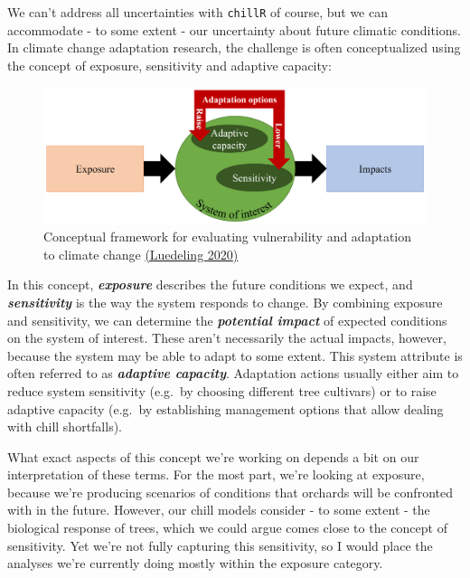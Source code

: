 \documentclass[
]{book}
\begin{document}
We can't address all uncertainties with \texttt{chillR} of course, but we can accommodate - to some extent - our uncertainty about future climatic conditions. In climate change adaptation research, the challenge is often conceptualized using the concept of exposure, sensitivity and adaptive capacity:

\begin{figure}
\centering
\includegraphics{pictures/adaptation_challenge.png}
\caption{Conceptual framework for evaluating vulnerability and adaptation to climate change \href{https://www.actahort.org/members/showpdf?booknrarnr=1281_58}{(Luedeling \protect\hyperlink{ref-luedeling_IHC_adapt_2020}{2020})}}
\end{figure}

In this concept, \textbf{\emph{exposure}} describes the future conditions we expect, and \textbf{\emph{sensitivity}} is the way the system responds to change. By combining exposure and sensitivity, we can determine the \textbf{\emph{potential impact}} of expected conditions on the system of interest. These aren't necessarily the actual impacts, however, because the system may be able to adapt to some extent. This system attribute is often referred to as \textbf{\emph{adaptive capacity}}. Adaptation actions usually either aim to reduce system sensitivity (e.g.~by choosing different tree cultivars) or to raise adaptive capacity (e.g.~by establishing management options that allow dealing with chill shortfalls).

What exact aspects of this concept we're working on depends a bit on our interpretation of these terms. For the most part, we're looking at exposure, because we're producing scenarios of conditions that orchards will be confronted with in the future. However, our chill models consider - to some extent - the biological response of trees, which we could argue comes close to the concept of sensitivity. Yet we're not fully capturing this sensitivity, so I would place the analyses we're currently doing mostly within the exposure category.
\end{document}
